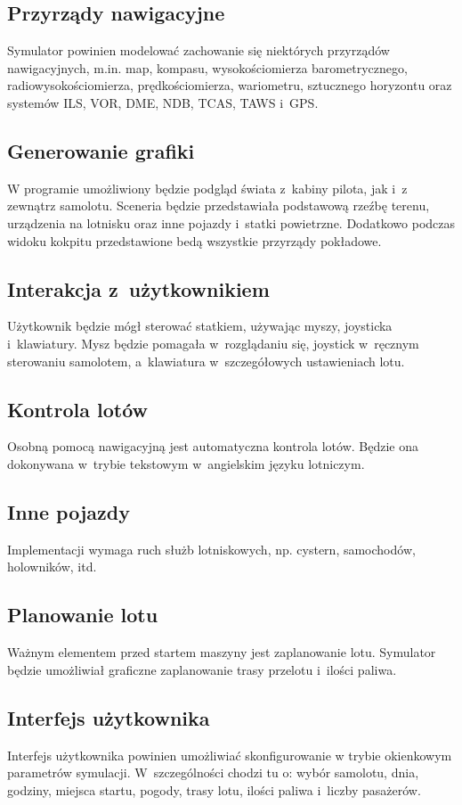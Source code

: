 \documentclass{mwrep}
\begin{document}
\subsection{Przyrządy nawigacyjne}
Symulator powinien modelować zachowanie się niektórych przyrządów nawigacyjnych, m.in. map, kompasu, wysokościomierza barometrycznego, radiowysokościomierza, prędkościomierza, wariometru, sztucznego horyzontu oraz systemów ILS, VOR, DME, NDB, TCAS, TAWS i~GPS.

\subsection{Generowanie grafiki}
W programie umożliwiony będzie podgląd świata z~kabiny pilota, jak i~z zewnątrz samolotu. Sceneria będzie przedstawiała podstawową rzeźbę terenu, urządzenia na lotnisku oraz inne pojazdy i~statki powietrzne. Dodatkowo podczas widoku kokpitu przedstawione bedą wszystkie przyrządy pokładowe.

\subsection{Interakcja z~użytkownikiem}
Użytkownik będzie mógł sterować statkiem, używając myszy, joysticka i~klawiatury. Mysz będzie pomagała w~rozglądaniu się, joystick w~ręcznym sterowaniu samolotem, a~klawiatura w~szczegółowych ustawieniach lotu.

\subsection{Kontrola lotów}
Osobną pomocą nawigacyjną jest automatyczna kontrola lotów. Będzie ona dokonywana w~trybie tekstowym w~angielskim języku lotniczym.

\subsection{Inne pojazdy}
Implementacji wymaga ruch służb lotniskowych, np. cystern, samochodów, holowników, itd.

\subsection{Planowanie lotu}
Ważnym elementem przed startem maszyny jest zaplanowanie lotu. Symulator będzie umożliwiał graficzne zaplanowanie trasy przelotu i~ilości paliwa.

\subsection{Interfejs użytkownika}
Interfejs użytkownika powinien umożliwiać skonfigurowanie w trybie okienkowym parametrów symulacji. W~szczególności chodzi tu o: wybór samolotu, dnia, godziny, miejsca startu, pogody, trasy lotu, ilości paliwa i~liczby pasażerów.
\end{document}
